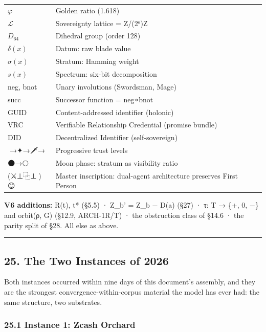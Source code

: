 \documentclass[
  11pt,
]{article}
\begin{document}
{\begin{longtable}[]{@{}
  >{\raggedright\arraybackslash}p{}
  >{\raggedright\arraybackslash}p{}@{}}
\(\varphi\) & Golden ratio (1.618) \\
\(\mathcal{L}\) & Sovereignty lattice = Z/(2⁶)Z \\
\(D_{64}\) & Dihedral group (order 128) \\
\(\delta(x)\) & Datum: raw blade value \\
\(\sigma(x)\) & Stratum: Hamming weight \\
\(s(x)\) & Spectrum: six-bit decomposition \\
neg, bnot & Unary involutions (Swordsman, Mage) \\
succ & Successor function = neg∘bnot \\
GUID & Content-addressed identifier (holonic) \\
VRC & Verifiable Relationship Credential (promise bundle) \\
DID & Decentralized Identifier (self-sovereign) \\
🔑→✦→🗡️→🔮 & Progressive trust levels \\
🌑→🌕 & Moon phase: stratum as visibility ratio \\
(⚔️⊥⿻⊥🧙)😊 & Master inscription: dual-agent architecture preserves
First Person \\
\end{longtable}
}

\textbf{V6 additions:} R(t), t* (§5.5) · Z\_b' = Z\_b − D(a) (§27) · τ:
T → \{+, 0, −\} and orbit(ρ, G) (§12.9, ARCH-1R/T) · the obstruction
class of §14.6 · the parity split of §28. All else as above.

\begin{center}\rule{0.5\linewidth}{0.5pt}\end{center}

\subsection{25. The Two Instances of
2026}\label{the-two-instances-of-2026}

Both instances occurred within nine days of this document's assembly,
and they are the strongest convergence-within-corpus material the model
has ever had: the same structure, two substrates.

\subsubsection{25.1 Instance 1: Zcash
Orchard}\label{instance-1-zcash-orchard}
\end{document}
